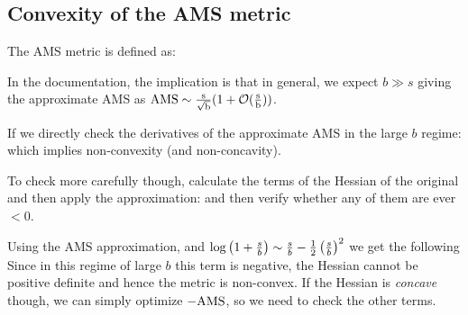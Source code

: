
\begin{appendices}
\section{Convexity of the AMS metric}
\label{appendix:ams}
The AMS metric is defined as:

In the documentation, the implication is that in general, we expect $b \gg s$ giving the approximate AMS as $\rm{AMS} \sim \frac{s}{\sqrt{b}}(1+\mathcal{O}(\frac{s}{b}))$.

If we directly check the derivatives of the approximate AMS in the large $b$ regime:
which implies non-convexity (and non-concavity).

To check more carefully though, calculate the terms of the Hessian of the original and then apply the approximation:
and then verify whether any of them are ever $<0$.

Using the AMS approximation, and $\log\left(1+\frac{s}{b}\right) \sim \frac{s}{b} - \frac{1}{2}\left(\frac{s}{b}\right)^2$ we get the following
Since in this regime of large $b$ this term is negative, the Hessian cannot be positive definite and hence the metric is non-convex. If the Hessian is \emph{concave} though, we can simply optimize $-\rm{AMS}$, so we need to check the other terms.


\end{appendices}
